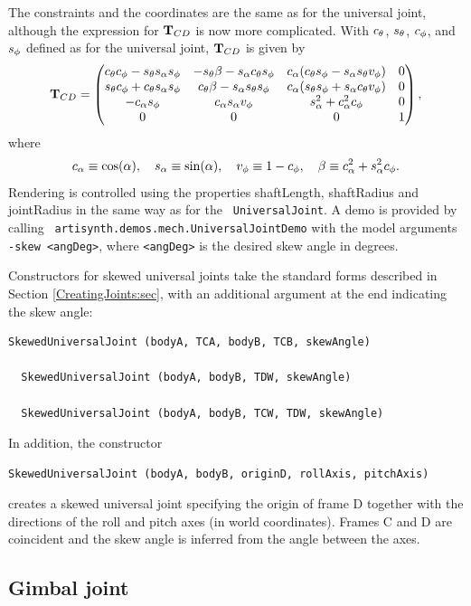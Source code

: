 The constraints and the coordinates are the same as for the universal
joint, although the expression for ${\bf T}_{CD}$ is now more complicated.
With $c_\theta$, $s_\theta$, $c_\phi$, and $s_\phi$ defined as for the universal
joint, ${\bf T}_{CD}$ is given by
%
\begin{equation*}
{\bf T}_{CD} = \left(\begin{matrix}
c_\theta c_\phi - s_\theta s_{\alpha}s_\phi & -s_\theta\beta - s_{\alpha}c_\theta s_\phi & c_{\alpha}(c_\theta s_\phi - s_{\alpha}s_\theta v_{\phi}) & 0 \\
s_\theta c_\phi + c_\theta s_{\alpha}s_\phi & c_\theta\beta - s_{\alpha}s_\theta s_\phi  & c_{\alpha}(s_\theta s_\phi + s_{\alpha}c_\theta v_{\phi}) & 0 \\
-c_{\alpha} s_\phi           & c_{\alpha}s_{\alpha}v_{\phi}             &  s_{\alpha}^2 + c_{\alpha}^2c_\phi       & 0 \\
0 & 0 & 0 & 1 
\end{matrix}\right),
\end{equation*}
where 
%
\begin{equation*}
c_{\alpha} \equiv \cos(\alpha), \quad
s_{\alpha} \equiv \sin(\alpha), \quad
v_{\phi} \equiv 1 - c_\phi, \quad \beta \equiv c_{\alpha}^2 + s_{\alpha}^2 c_\phi.
\end{equation*}
%
Rendering is controlled using the properties {\sf shaftLength}, {\sf
shaftRadius} and {\sf jointRadius} in the same way as for the {\tt
UniversalJoint}.  A demo is provided by calling {\tt
artisynth.demos.mech.UniversalJointDemo} with the model arguments {\tt
-skew <angDeg>}, where {\tt <angDeg>} is the desired skew angle in
degrees.

Constructors for skewed universal joints take the standard forms
described in Section \ref{CreatingJoints:sec}, with an additional
argument at the end indicating the skew angle:
\begin{lstlisting}[]
  SkewedUniversalJoint (bodyA, TCA, bodyB, TCB, skewAngle)

  SkewedUniversalJoint (bodyA, bodyB, TDW, skewAngle)

  SkewedUniversalJoint (bodyA, bodyB, TCW, TDW, skewAngle)
\end{lstlisting}
%
In addition, the constructor
\begin{lstlisting}[]
  SkewedUniversalJoint (bodyA, bodyB, originD, rollAxis, pitchAxis)
\end{lstlisting}
%
creates a skewed universal joint specifying the origin of frame D
together with the directions of the roll and pitch axes (in world
coordinates). Frames C and D are coincident and the skew angle is
inferred from the angle between the axes.

\subsection{Gimbal joint}

